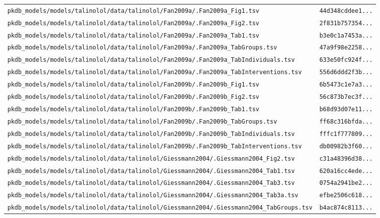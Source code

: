 \documentclass{article}
\begin{document}
\begin{longtable}{ll}
\texttt{pkdb\_models/models/talinolol/data/talinolol/Fan2009a/.Fan2009a\_Fig1.tsv} & \texttt{44d348cddee1...} \\
\texttt{pkdb\_models/models/talinolol/data/talinolol/Fan2009a/.Fan2009a\_Fig2.tsv} & \texttt{2f831b757354...} \\
\texttt{pkdb\_models/models/talinolol/data/talinolol/Fan2009a/.Fan2009a\_Tab1.tsv} & \texttt{b3e0c1a7453a...} \\
\texttt{pkdb\_models/models/talinolol/data/talinolol/Fan2009a/.Fan2009a\_TabGroups.tsv} & \texttt{47a9f98e2258...} \\
\texttt{pkdb\_models/models/talinolol/data/talinolol/Fan2009a/.Fan2009a\_TabIndividuals.tsv} & \texttt{633e50fc924f...} \\
\texttt{pkdb\_models/models/talinolol/data/talinolol/Fan2009a/.Fan2009a\_TabInterventions.tsv} & \texttt{556d6ddd2f3b...} \\
\texttt{pkdb\_models/models/talinolol/data/talinolol/Fan2009b/.Fan2009b\_Fig1.tsv} & \texttt{6b5473c1e7a3...} \\
\texttt{pkdb\_models/models/talinolol/data/talinolol/Fan2009b/.Fan2009b\_Fig2.tsv} & \texttt{56c873b7ec3f...} \\
\texttt{pkdb\_models/models/talinolol/data/talinolol/Fan2009b/.Fan2009b\_Tab1.tsv} & \texttt{b68d93d07e11...} \\
\texttt{pkdb\_models/models/talinolol/data/talinolol/Fan2009b/.Fan2009b\_TabGroups.tsv} & \texttt{ff68c316bfda...} \\
\texttt{pkdb\_models/models/talinolol/data/talinolol/Fan2009b/.Fan2009b\_TabIndividuals.tsv} & \texttt{fffc1f777809...} \\
\texttt{pkdb\_models/models/talinolol/data/talinolol/Fan2009b/.Fan2009b\_TabInterventions.tsv} & \texttt{db00982b3f60...} \\
\texttt{pkdb\_models/models/talinolol/data/talinolol/Giessmann2004/.Giessmann2004\_Fig2.tsv} & \texttt{c31a48396d38...} \\
\texttt{pkdb\_models/models/talinolol/data/talinolol/Giessmann2004/.Giessmann2004\_Tab1.tsv} & \texttt{620a16cc4ede...} \\
\texttt{pkdb\_models/models/talinolol/data/talinolol/Giessmann2004/.Giessmann2004\_Tab3.tsv} & \texttt{0754a2941be2...} \\
\texttt{pkdb\_models/models/talinolol/data/talinolol/Giessmann2004/.Giessmann2004\_Tab3a.tsv} & \texttt{efbe2506c618...} \\
\texttt{pkdb\_models/models/talinolol/data/talinolol/Giessmann2004/.Giessmann2004\_TabGroups.tsv} & \texttt{b4ac874c8113...} \\

\end{longtable}
\end{document}
